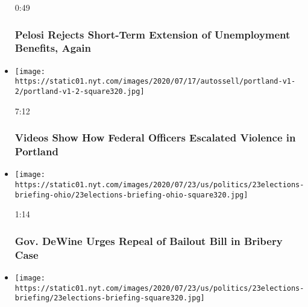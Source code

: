 \begin{itemize}
  0:49

  \hypertarget{pelosi-rejects-short-term-extension-of-unemployment-benefits-again}{%
  \subsubsection{Pelosi Rejects Short-Term Extension of Unemployment
  Benefits,
  Again}\label{pelosi-rejects-short-term-extension-of-unemployment-benefits-again}}
\item
  \href{https://www.nytimes.com/video/us/100000007243995/portland-protests-federal-government.html?action=click\&module=video-series-bar\&region=header\&pgtype=Article\&playlistId=video/us-politics}{}

  \texttt{[image: https://static01.nyt.com/images/2020/07/17/autossell/portland-v1-2/portland-v1-2-square320.jpg]}

  7:12

  \hypertarget{videos-show-how-federal-officers-escalated-violence-in-portland}{%
  \subsubsection{Videos Show How Federal Officers Escalated Violence in
  Portland}\label{videos-show-how-federal-officers-escalated-violence-in-portland}}
\item
  \href{https://www.nytimes.com/video/us/100000007253892/mike-dewine-repeal-law-bribery-case.html?action=click\&module=video-series-bar\&region=header\&pgtype=Article\&playlistId=video/us-politics}{}

  \texttt{[image: https://static01.nyt.com/images/2020/07/23/us/politics/23elections-briefing-ohio/23elections-briefing-ohio-square320.jpg]}

  1:14

  \hypertarget{gov-dewine-urges-repeal-of-bailout-bill-in-bribery-case}{%
  \subsubsection{Gov. DeWine Urges Repeal of Bailout Bill in Bribery
  Case}\label{gov-dewine-urges-repeal-of-bailout-bill-in-bribery-case}}
\item
  \href{https://www.nytimes.com/video/us/100000007253968/trump-cancels-gop-convention.html?action=click\&module=video-series-bar\&region=header\&pgtype=Article\&playlistId=video/us-politics}{}

  \texttt{[image: https://static01.nyt.com/images/2020/07/23/us/politics/23elections-briefing/23elections-briefing-square320.jpg]}


\end{itemize}
